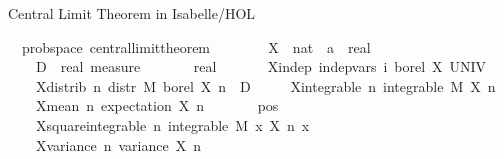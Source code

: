 \documentclass[usepdftitle=false]{beamer}
\begin{document}
\begin{frame}{Central Limit Theorem in Isabelle/HOL}

\begin{isabellebody}
\isamarkupfalse%
\ {\isacharparenleft}\ prob{\isacharunderscore}space{\isacharparenright}\ central{\isacharunderscore}limit{\isacharunderscore}theorem{\isacharcolon}\isanewline
\ \ \ \isanewline
\ \ \ \ X\ {\isacharcolon}{\isacharcolon}\ {\isachardoublequoteopen}nat\ {\isasymRightarrow}\ {\isacharprime}a\ {\isasymRightarrow}\ real{\isachardoublequoteclose}\ \isanewline
\ \ \ \ D\ {\isacharcolon}{\isacharcolon}\ {\isachardoublequoteopen}real\ measure{\isachardoublequoteclose}\ \isanewline
\ \ \ \ {\isasymsigma}\ {\isacharcolon}{\isacharcolon}\ real\isanewline
\ \ \isanewline
\ \ \ \ X{\isacharunderscore}indep{\isacharcolon}\ {\isachardoublequoteopen}indep{\isacharunderscore}vars\ {\isacharparenleft}{\isasymlambda}i{\isachardot}\ borel{\isacharparenright}\ X\ UNIV{\isachardoublequoteclose}\ \isanewline
\ \ \ \ X{\isacharunderscore}distrib{\isacharcolon}\ {\isachardoublequoteopen}{\isasymAnd}n{\isachardot}\ distr\ M\ borel\ {\isacharparenleft}X\ n{\isacharparenright}\ {\isacharequal}\ D{\isachardoublequoteclose}\ \isanewline
\ \ \ \ X{\isacharunderscore}integrable{\isacharcolon}\ {\isachardoublequoteopen}{\isasymAnd}n{\isachardot}\ integrable\ M\ {\isacharparenleft}X\ n{\isacharparenright}{\isachardoublequoteclose}\ \isanewline
\ \ \ \ X{\isacharunderscore}mean{\isacharunderscore}{}{\isacharcolon}\ {\isachardoublequoteopen}{\isasymAnd}n{\isachardot}\ expectation\ {\isacharparenleft}X\ n{\isacharparenright}\ {\isacharequal}\ {}{\isachardoublequoteclose}\ \isanewline
\ \ \ \ {\isasymsigma}{\isacharunderscore}pos{\isacharcolon}\ {\isachardoublequoteopen}{\isasymsigma}\ {\isachargreater}\ {}{\isachardoublequoteclose}\ \isanewline
\ \ \ \ X{\isacharunderscore}square{\isacharunderscore}integrable{\isacharcolon}\ {\isachardoublequoteopen}{\isasymAnd}n{\isachardot}\ integrable\ M\ {\isacharparenleft}{\isasymlambda}x{\isachardot}\ {\isacharparenleft}X\ n\ x{\isacharparenright}\ \isanewline
\ \ \ \ X{\isacharunderscore}variance{\isacharcolon}\ {\isachardoublequoteopen}{\isasymAnd}n{\isachardot}\ variance\ {\isacharparenleft}X\ n{\isacharparenright}\ {\isacharequal}\ {\isasymsigma}\isanewline

\end{isabellebody}
\end{frame}
\end{document}
